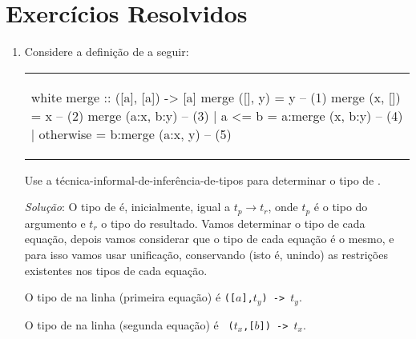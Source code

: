 \section{Exercícios Resolvidos}

\begin{enumerate}

%
%

 \item \label{Ex:merge} Considere a definição de  a seguir:

\begin{center}
\begin{tabular}{l}
\begin{alg}{.9\textwidth}{white}
merge :: ([a], [a]) -> [a]
merge ([], y) = y                   -- (1)
merge (x, []) = x                   -- (2) 
merge (a:x, b:y)                    -- (3) 
  | a <= b    = a:merge (x, b:y)    -- (4)
  | otherwise = b:merge (a:x, y)    -- (5)
\end{alg}
\end{tabular}
\end{center}

Use a técnica-informal-de-inferência-de-tipos para determinar o tipo
de .

{\it Solução\/}: O tipo de  é, inicialmente, igual a $t_p
\rightarrow t_r$, onde $t_p$ é o tipo do argumento e $t_r$ o tipo do
resultado.  Vamos determinar o tipo de cada equação, depois vamos
considerar que o tipo de cada equação é o mesmo, e para isso vamos
usar unificação, conservando (isto é, unindo) as restrições existentes
nos tipos de cada equação.

O tipo de  na linha  (primeira equação) é
  {\tt ([$a$],$t_y$) -> $t_y$}.

O tipo de  na linha  (segunda equação) é {\tt
  ($t_x$,[$b$]) -> $t_x$}.


\end{enumerate}
